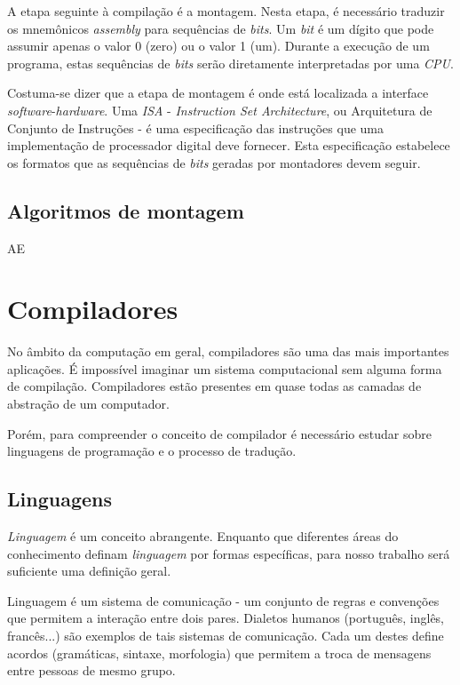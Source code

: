 A etapa seguinte à compilação é a montagem. Nesta etapa, é necessário traduzir os mnemônicos \textit{assembly} para sequências de \textit{bits}. Um \textit{bit} é um dígito que pode assumir apenas o valor 0 (zero) ou o valor 1 (um). Durante a execução de um programa, estas sequências de \textit{bits} serão diretamente interpretadas por uma \textit{CPU}.

Costuma-se dizer que a etapa de montagem é onde está localizada a interface \textit{software}-\textit{hardware}. Uma \textit{ISA} - \textit{Instruction Set Architecture}, ou Arquitetura de Conjunto de Instruções - é uma especificação das instruções que uma implementação de processador digital deve fornecer. Esta especificação estabelece os formatos que as sequências de \textit{bits} geradas por montadores devem seguir.

\subsection{Algoritmos de montagem}

AE

\section{Compiladores}

No âmbito da computação em geral, compiladores são uma das mais importantes
aplicações.  É impossível imaginar um sistema computacional sem alguma forma de
compilação. Compiladores estão presentes em quase todas as camadas de abstração
de um computador.

Porém, para compreender o conceito de compilador é necessário estudar sobre
linguagens de programação e o processo de tradução.

\subsection{Linguagens}

\textit{Linguagem} é um conceito abrangente. Enquanto que diferentes áreas do
conhecimento definam \textit{linguagem} por formas específicas, para nosso
trabalho será suficiente uma definição geral.

Linguagem é um sistema de comunicação - um conjunto de regras e convenções que
permitem a interação entre dois pares. Dialetos humanos (português, inglês,
francês...) são exemplos de tais sistemas de comunicação. Cada um destes define
acordos (gramáticas, sintaxe, morfologia) que permitem a troca de mensagens
entre pessoas de mesmo grupo.

